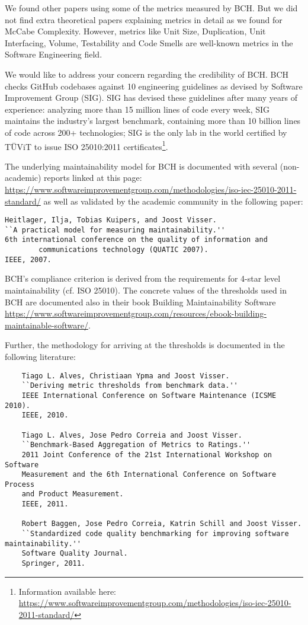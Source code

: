 \documentclass[11pt,fleqn]{article}
\begin{document}
We found other papers using some of the metrics measured by BCH. But we did not find
extra theoretical papers explaining metrics in detail as we found for McCabe Complexity.
However, metrics like Unit Size, Duplication, Unit Interfacing, Volume, Testability
and Code Smells are well-known metrics in the Software Engineering field. 

We would like to address your concern regarding the credibility of BCH. BCH checks GitHub 
codebases against 10 engineering guidelines as devised by Software Improvement Group 
(SIG). SIG has devised these guidelines after many years of experience: analyzing more 
than 15 million lines of code every week, SIG maintains the industry’s largest 
benchmark, containing more than 10 billion lines of code across 200+ technologies; SIG 
is the only lab in the world certified by TÜViT to issue ISO 25010:2011 
certificates\footnote{Information available here: 
\url{https://www.softwareimprovementgroup.com/methodologies/iso-iec-25010-2011-standard/}}.

The underlying maintainability model for BCH is documented with several
(non-academic) reports linked at this page:
\url{https://www.softwareimprovementgroup.com/methodologies/iso-iec-25010-2011-standard/} as 
well as validated by the academic community in the following paper:

\begin{verbatim}
Heitlager, Ilja, Tobias Kuipers, and Joost Visser. 
``A practical model for measuring maintainability.'' 
6th international conference on the quality of information and 
        communications technology (QUATIC 2007). 
IEEE, 2007.
\end{verbatim}

BCH's compliance criterion is derived from the requirements for 4-star level maintainability (cf. ISO 25010). 
The concrete values of the thresholds used in BCH are documented also in their book Building Maintainability 
Software \url{https://www.softwareimprovementgroup.com/resources/ebook-building-maintainable-software/}.

Further, the methodology for arriving at the thresholds is documented in the following 
literature:

\begin{verbatim}
    Tiago L. Alves, Christiaan Ypma and Joost Visser. 
    ``Deriving metric thresholds from benchmark data.'' 
    IEEE International Conference on Software Maintenance (ICSME 2010). 
    IEEE, 2010.

    Tiago L. Alves, Jose Pedro Correia and Joost Visser. 
    ``Benchmark-Based Aggregation of Metrics to Ratings.'' 
    2011 Joint Conference of the 21st International Workshop on Software 
    Measurement and the 6th International Conference on Software Process 
    and Product Measurement. 
    IEEE, 2011.

    Robert Baggen, Jose Pedro Correia, Katrin Schill and Joost Visser. 
    ``Standardized code quality benchmarking for improving software maintainability.'' 
    Software Quality Journal.
    Springer, 2011.

\end{verbatim}
\end{document}
